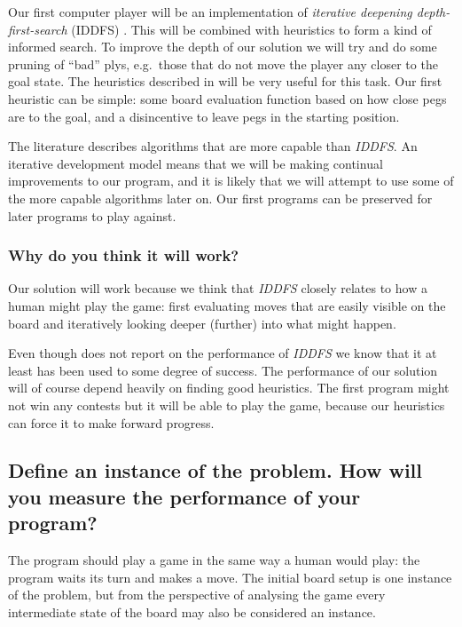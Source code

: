 \documentclass[a4paper,11pt]{article}
\begin{document}
Our first computer player will be an implementation of \emph{iterative
  deepening depth-first-search} (IDDFS) \cite{aimodern}. This will be
combined with heuristics to form a kind of informed search. To improve
the depth of our solution we will try and do some pruning of ``bad''
plys, e.g.~those that do not move the player any closer to the goal
state. The heuristics described in \cite{ulfhake} will be very useful
for this task. Our first heuristic can be simple: some board
evaluation function based on how close pegs are to the goal, and a
disincentive to leave pegs in the starting position.

The literature describes algorithms that are more capable than
\emph{IDDFS}. An iterative development model means that we will be
making continual improvements to our program, and it is likely that we
will attempt to use some of the more capable algorithms later on. Our
first programs can be preserved for later programs to play against.

\subsubsection{Why do you think it will work?}

Our solution will work because we think that \emph{IDDFS} closely
relates to how a human might play the game: first evaluating moves
that are easily visible on the board and iteratively looking deeper
(further) into what might happen.

Even though \cite{Huang:2001:SGP:378593.378708} does not report on the
performance of \emph{IDDFS} we know that it at least has been used to
some degree of success. The performance of our solution will of course
depend heavily on finding good heuristics. The first program might not
win any contests but it will be able to play the game, because our
heuristics can force it to make forward progress.

\subsection{Define an instance of the problem. How will you measure the performance of your program?}

The program should play a game in the same way a human would play: the
program waits its turn and makes a move. The initial board setup is
one instance of the problem, but from the perspective of analysing the
game every intermediate state of the board may also be considered an
instance.
\end{document}
